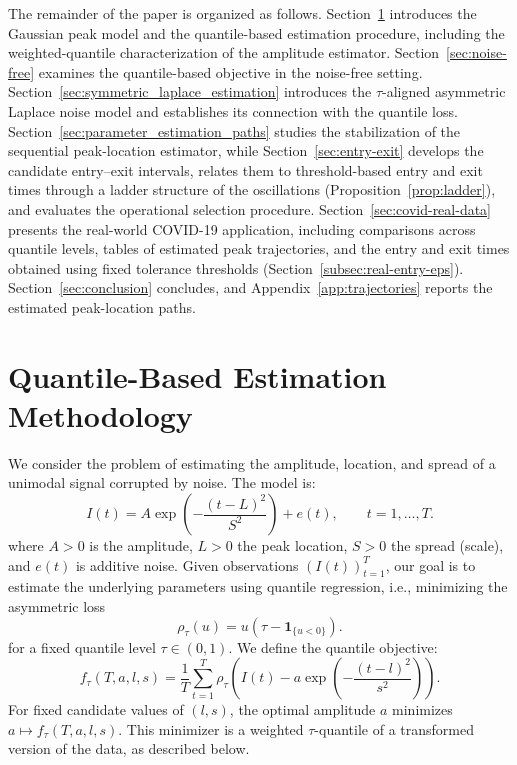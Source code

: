 \documentclass[12pt,a4paper]{article}
\begin{document}
The remainder of the paper is organized as follows.
Section~\ref{section:quantile_amplitude} introduces the Gaussian peak model and
the quantile-based estimation procedure, including the weighted-quantile
characterization of the amplitude estimator. Section~\ref{sec:noise-free}
examines the quantile-based objective in the noise-free setting.
Section~\ref{sec:symmetric_laplace_estimation} introduces the
\(\tau\)-aligned asymmetric Laplace noise model and establishes its connection
with the quantile loss. Section~\ref{sec:parameter_estimation_paths} studies the
stabilization of the sequential peak-location estimator, while
Section~\ref{sec:entry-exit} develops the candidate entry--exit intervals,
relates them to threshold-based entry and exit times through a ladder structure
of the oscillations (Proposition~\ref{prop:ladder}), and evaluates the
operational selection procedure. Section~\ref{sec:covid-real-data} presents the
real-world COVID-19 application, including comparisons across quantile levels,
tables of estimated peak trajectories, and the entry and exit times obtained
using fixed tolerance thresholds (Section~\ref{subsec:real-entry-eps}).
Section~\ref{sec:conclusion} concludes, and Appendix~\ref{app:trajectories}
reports the estimated peak-location paths.

\section{Quantile-Based Estimation Methodology}
\label{section:quantile_amplitude}

We consider the problem of estimating the amplitude, location, and spread of a unimodal signal corrupted by noise. The model is:
\begin{equation}
	I(t)
	=
	A\exp\left(-\frac{(t-L)^2}{S^2}\right)+e(t),
	\qquad t=1,\ldots,T.
	\label{eq:signal_model}
\end{equation}
where \( A > 0 \) is the amplitude, \( L > 0 \) the peak location, \( S > 0 \) the spread (scale), and \( e(t) \) is additive noise. Given observations \( (I(t))_{t=1}^T \), our goal is to estimate the underlying parameters using quantile regression, i.e., minimizing the asymmetric loss
\begin{equation}
	\rho_\tau(u)
	=
	u\left(\tau-\mathbf{1}_{\{u<0\}}\right).
	\label{eq:check_function}
\end{equation}
for a fixed quantile level \( \tau \in (0,1) \).
We define the quantile objective:
\begin{equation}
	f_\tau(T,a,l,s)
	=
	\frac{1}{T}
	\sum_{t=1}^T
	\rho_\tau
	\left(
	I(t)-a\exp\left(-\frac{(t-l)^2}{s^2}\right)
	\right).
	\label{eq:quantile_objective}
\end{equation}
For fixed candidate values of \( (l,s) \), the optimal amplitude \( a \) minimizes \( a \mapsto f_\tau(T,a,l,s) \). This minimizer is a weighted \(\tau\)-quantile of a transformed version of the data, as described below.
\end{document}
